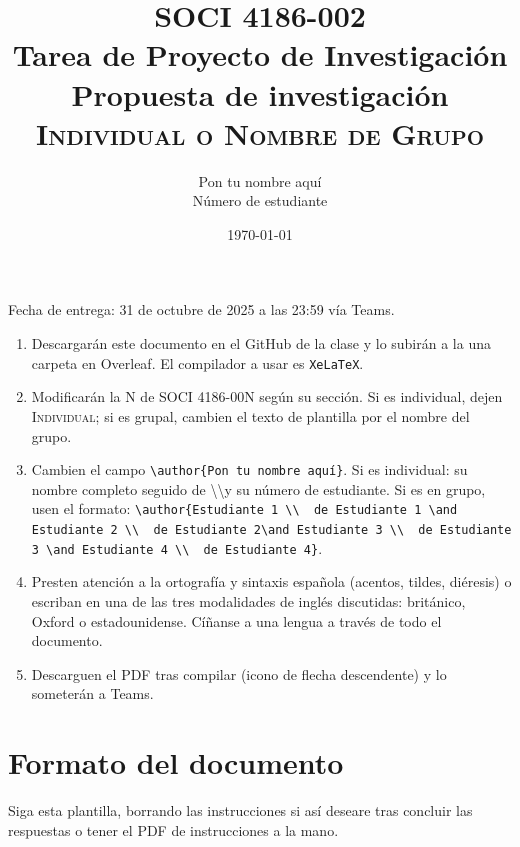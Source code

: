\documentclass[11pt]{article}
\title{SOCI 4186-002\\ Tarea de Proyecto de Investigación \textnumero 4 \\ Propuesta de investigación \\ \textsc{Individual o Nombre de Grupo}}
\author{Pon tu nombre aquí \\ Número de estudiante}
\date{\today} %
\begin{document}
\singlespacing
\maketitle
Fecha de entrega: 31 de octubre de 2025 a las 23:59 vía Teams.

\begin{enumerate}
    \item Descargarán este documento en el GitHub de la clase y lo subirán a la una carpeta en Overleaf. El compilador a usar es \texttt{XeLaTeX}.
    \item Modificarán la N de SOCI 4186-00N según su sección. Si es individual, dejen \textsc{Individual}; si es grupal, cambien el texto de plantilla por el nombre del grupo.
    \item Cambien el campo \texttt{\textbackslash author\{Pon tu nombre aquí\}}. Si es individual: su nombre completo seguido de \textbackslash\textbackslash y su número de estudiante. Si es en grupo, usen el formato: \texttt{\textbackslash author\{Estudiante 1 \textbackslash\textbackslash \ \textnumero\ de Estudiante 1 \textbackslash and Estudiante 2 \textbackslash\textbackslash \ \textnumero\ de Estudiante 2\textbackslash and Estudiante 3 \textbackslash\textbackslash \ \textnumero\ de Estudiante 3 \textbackslash and Estudiante 4 \textbackslash\textbackslash\ \textnumero\ de Estudiante 4\}}.
    \item Presten atención a la ortografía y sintaxis española (acentos, tildes, diéresis) o escriban en una de las tres modalidades de inglés discutidas: británico, Oxford o estadounidense. Cíñanse a una lengua a través de todo el documento.
    \item Descarguen el PDF tras compilar (icono de flecha descendente) y lo someterán a Teams.
\end{enumerate}

\section*{Formato del documento}
Siga esta plantilla, borrando las instrucciones si así deseare tras concluir las respuestas o tener el PDF de instrucciones a la mano. 
\onehalfspacing
\end{document}
